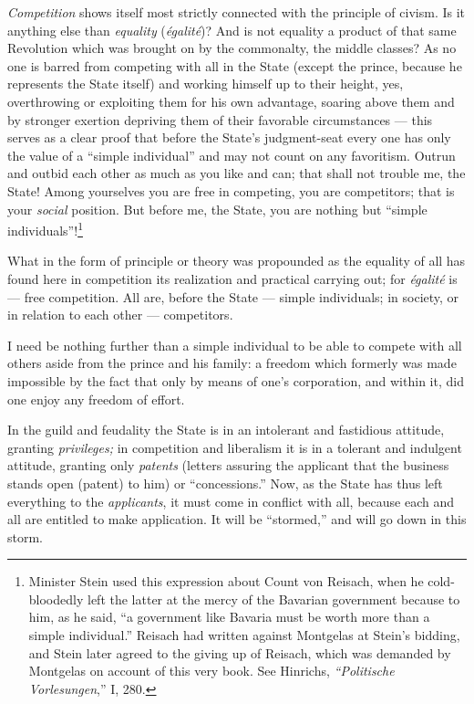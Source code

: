 \myhrule


\textit{Competition} shows itself most strictly connected with the principle 
of civism. Is it anything else than \textit{equality} (\textit{\'egalit\'e})? 
And is not equality a product of that same Revolution which was brought on by 
the commonalty, the middle classes? As no one is barred from competing with 
all in the State (except the prince, because he represents the State itself) 
and working himself up to their height, yes, overthrowing or exploiting them 
for his own advantage, soaring above them and by stronger exertion depriving 
them of their favorable circumstances --- this serves as a clear proof that 
before the State's judgment-seat every one has only the value of a ``simple 
individual'' and may not count on any favoritism. Outrun and outbid each 
other as much as you like and can; that shall not trouble me, the State! Among 
yourselves you are free in competing, you are competitors; that is your 
\textit{social} position. But before me, the State, you are nothing but 
``simple individuals''!\footnote{Minister Stein used this expression about 
Count von Reisach, when he cold-bloodedly left the latter at the mercy of the 
Bavarian government because to him, as he said, ``a government like Bavaria 
must be worth more than a simple individual.'' Reisach had written against 
Montgelas at Stein's bidding, and Stein later agreed to the giving up of 
Reisach, which was demanded by Montgelas on account of this very book. See 
Hinrichs, \textit{``Politische Vorlesungen},'' I, 280.}

What in the form of principle or theory was propounded as the equality of all 
has found here in competition its realization and practical carrying out; for 
\textit{\'egalit\'e} is --- free competition. All are, before the State --- simple individuals; in society, or in relation to each other --- competitors.

I need be nothing further than a simple individual to be able to compete with 
all others aside from the prince and his family: a freedom which formerly was 
made impossible by the fact that only by means of one's corporation, and 
within it, did one enjoy any freedom of effort.

In the guild and feudality the State is in an intolerant and fastidious 
attitude, granting \textit{privileges;} in competition and liberalism it is in 
a tolerant and indulgent attitude, granting only \textit{patents} (letters 
assuring the applicant that the business stands open (patent) to him) or 
``concessions.'' Now, as the State has thus left everything to the 
\textit{applicants}, it must come in conflict with all, because each and all 
are entitled to make application. It will be ``stormed,'' and will go down 
in this storm.

